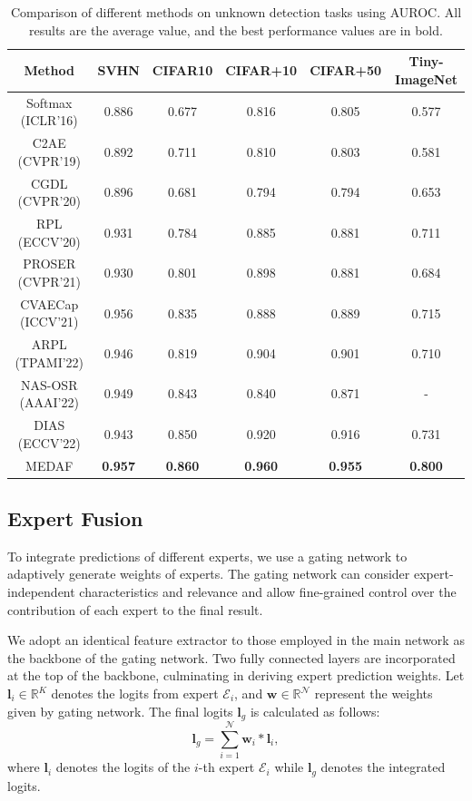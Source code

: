 \documentclass[letterpaper]{article} %
\begin{document}
\begin{table}[ht]
\centering
\small
\begin{tabular}{cccccc}
\hline
Method & SVHN & CIFAR10 & CIFAR+10 & CIFAR+50 & Tiny-ImageNet \\ \hline
Softmax (ICLR'16)& 0.886 & 0.677 & 0.816 & 0.805 & 0.577 \\ 
C2AE (CVPR'19)& 0.892 & 0.711 & 0.810 & 0.803 & 0.581 \\ 
CGDL (CVPR'20)& 0.896 & 0.681 & 0.794 & 0.794 & 0.653 \\ 
RPL (ECCV'20)& 0.931 & 0.784 & 0.885 & 0.881 & 0.711 \\ 
PROSER (CVPR'21)& 0.930 & 0.801 & 0.898 & 0.881 & 0.684 \\ 
CVAECap (ICCV'21)& 0.956 & 0.835 & 0.888 & 0.889 & 0.715 \\ 
ARPL (TPAMI'22)& 0.946 & 0.819 & 0.904 & 0.901 & 0.710 \\ 
NAS-OSR (AAAI'22)& 0.949 & 0.843 & 0.840 & 0.871 & - \\ 
DIAS (ECCV'22)& 0.943 & 0.850 & 0.920 & 0.916 & 0.731 \\ \hline
MEDAF & \textbf{0.957} & \textbf{0.860} & \textbf{0.960} & \textbf{0.955} & \textbf{0.800} \\ \hline
\end{tabular}
\caption{Comparison of different methods on unknown detection tasks using AUROC. All results are the average value, and the best performance values are in bold.}
\label{table_auroc}
\end{table}

\subsection{Expert Fusion}To integrate predictions of different experts, we use a gating network to adaptively generate weights of experts. The gating network can consider expert-independent characteristics and relevance and allow fine-grained control over the contribution of each expert to the final result.

We adopt an identical feature extractor to those employed in the main network as the backbone of the gating network. Two fully connected layers are incorporated at the top of the backbone, culminating in deriving expert prediction weights. Let $\boldsymbol{l}_i\in\mathbb{R}^{K}$ denotes the logits from expert $\mathcal{E}_i$, and $\boldsymbol{w}\in\mathbb{R}^{\mathcal{N}}$ represent the weights given by gating network. The final logits $\boldsymbol{l}_g$ is calculated as follows:
\begin{equation}
\boldsymbol{l}_g=\sum_{i=1}^{\mathcal{N}}\boldsymbol{w}_i*\boldsymbol{l}_i,
\label{eq:gating_lg}
\end{equation}
where $\boldsymbol{l}_i$ denotes the logits of the $i$-th expert $\mathcal{E}_i$ while $\boldsymbol{l}_g$ denotes the integrated logits.
\end{document}
